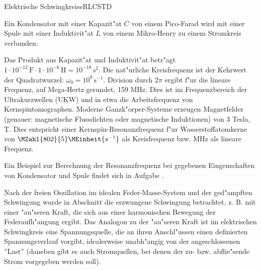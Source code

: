 \begin{MXContent}{Elektrische Schwingkreise}{RLC}{STD}
\begin{MExample}
Ein Kondensator mit einer Kapazit"at $C$ von einem Pico-Farad wird mit einer Spule mit einer Induktivit"at $L$ von einem Mikro-Henry zu einem Stromkreis verbunden:
\begin{center}
\end{center}
Das Produkt aus Kapazit"at und Induktivit"at betr"agt $1\cdot 10^{-12} \,\text{F}\cdot 1\cdot 10^{-6} \,\text{H} = 10^{-18}\,\text{s}^2$. Die nat"urliche Kreisfrequenz ist der Kehrwert der Quadratwurzel: $\omega_0 = 10^{9}\,\text{s}^{-1}$. Division durch $2\pi$ ergibt f"ur die lineare Frequenz, auf Mega-Hertz gerundet, 159 MHz. Dies ist im Frequenzbereich der Ultrakurzwellen (UKW) und in etwa die Arbeitsfrequenz von Kernspintomographen. Moderne Ganzk"orper-Systeme erzeugen Magnetfelder (genauer: magnetische Flussdichten oder magnetische Induktionen) von 3 Tesla, T. Dies entspricht einer Kernspin-Resonanzfrequenz f"ur Wasserstoffatomkerne von $\MZahl{802}{5} \MEinheit{s^{-1}}$ als Kreisfrequenz bzw.  MHz als lineare Frequenz. 
\end{MExample}


Ein Beispiel zur Berechnung der Resonanzfrequenz bei gegebenen Eingenschaften von Kondensator und Spule findet sich in Aufgabe
.

Nach der freien Oszillation im idealen Feder-Masse-System und der ged"ampften Schwingung wurde in Abschnitt  die erzwungene Schwingung betrachtet, z. B. mit einer "au"seren Kraft, die sich aus einer harmonischen Bewegung der Federaufh"angung ergibt.
Das Analogon zu der "au"seren Kraft ist im elektrischen Schwingkreis eine Spannungsquelle, die an ihren Anschl"ussen einen definierten Spannungsverlauf vorgibt, idealerweise unabh"angig von der angeschlossenen ''Last'' (daneben gibt es auch Stromquellen, bei denen der zu- bzw. abflie"sende Strom vorgegeben werden soll). 


\end{MXContent}
